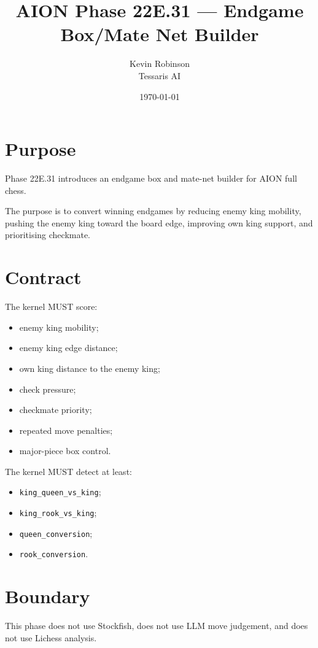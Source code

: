 \documentclass[11pt,a4paper]{article}
\title{\textbf{AION Phase 22E.31 --- Endgame Box/Mate Net Builder}}
\author{Kevin Robinson\\Tessaris AI}
\date{\today}
\begin{document}
\maketitle

\section{Purpose}

Phase 22E.31 introduces an endgame box and mate-net builder for AION full chess.

The purpose is to convert winning endgames by reducing enemy king mobility, pushing the enemy king toward the board edge, improving own king support, and prioritising checkmate.

\section{Contract}

The kernel MUST score:

\begin{itemize}[leftmargin=*]
  \item enemy king mobility;
  \item enemy king edge distance;
  \item own king distance to the enemy king;
  \item check pressure;
  \item checkmate priority;
  \item repeated move penalties;
  \item major-piece box control.
\end{itemize}

The kernel MUST detect at least:

\begin{itemize}[leftmargin=*]
  \item \texttt{king\_queen\_vs\_king};
  \item \texttt{king\_rook\_vs\_king};
  \item \texttt{queen\_conversion};
  \item \texttt{rook\_conversion}.
\end{itemize}

\section{Boundary}

This phase does not use Stockfish, does not use LLM move judgement, and does not use Lichess analysis.
\end{document}
